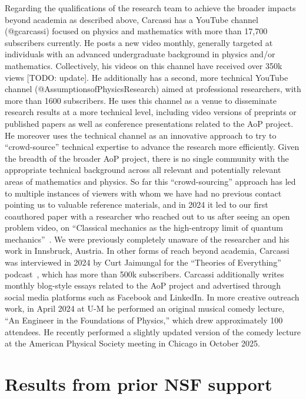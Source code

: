 Regarding the qualifications of the research team to achieve the broader impacts beyond academia as described above, Carcassi has a YouTube channel (@gcarcassi) focused on physics and mathematics with more than 17,700 subscribers currently.  He posts a new video monthly, generally targeted at individuals with an advanced undergraduate background in physics and/or mathematics.  Collectively, his videos on this channel have received over 350k views [TODO: update]. He additionally has a second, more technical YouTube channel (@AssumptionsofPhysicsResearch) aimed at professional researchers, with more than 1600 subscribers.  He uses this channel as a venue to disseminate research results at a more technical level, including video versions of preprints or published papers as well as conference presentations related to the AoP project.  He moreover uses the technical channel as an innovative approach to try to ``crowd-source'' technical expertise to advance the research more efficiently.  Given the breadth of the broader AoP project, there is no single community with the appropriate technical background across all relevant and potentially relevant areas of mathematics and physics.  So far this ``crowd-sourcing'' approach has led to multiple instances of viewers with whom we have had no previous contact pointing us to valuable reference materials, and in 2024 it led to our first coauthored paper with a researcher who reached out to us after seeing an open problem video, on ``Classical mechanics as the high-entropy limit of quantum mechanics''~\cite{aop-classicallimit}. We were previously completely unaware of the researcher and his work in Innsbruck, Austria.  In other forms of reach beyond academia, Carcassi was interviewed in 2024 by Curt Jaimungal for the ``Theories of Everything'' podcast~\cite{Carcassi-ToEInterview}, which has more than 500k subscribers.  Carcassi additionally writes monthly blog-style essays related to the AoP project and advertised through social media platforms such as Facebook and LinkedIn.  In more creative outreach work, in April 2024 at U-M he performed an original musical comedy lecture, ``An Engineer in the Foundations of Physics,'' which drew approximately 100 attendees. He recently performed a slightly updated version of the comedy lecture at the American Physical Society meeting in Chicago in October 2025.


\section{Results from prior NSF support}

